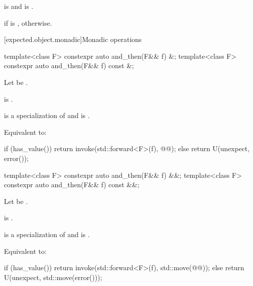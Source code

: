 \begin{itemdescr}
\pnum
\mandates
{} is  and
 is .

\pnum
\returns
{} if  is ,
 otherwise.
\end{itemdescr}

[expected.object.monadic]{Monadic operations}

%
\begin{itemdecl}
template<class F> constexpr auto and_then(F&& f) &;
template<class F> constexpr auto and_then(F&& f) const &;
\end{itemdecl}

\begin{itemdescr}
\pnum
Let  be .

\pnum
\constraints
{} is .

\pnum
\mandates
{} is a specialization of  and
 is .

\pnum
\effects
Equivalent to:
\begin{codeblock}
if (has_value())
  return invoke(std::forward<F>(f), @@);
else
  return U(unexpect, error());
\end{codeblock}
\end{itemdescr}

%
\begin{itemdecl}
template<class F> constexpr auto and_then(F&& f) &&;
template<class F> constexpr auto and_then(F&& f) const &&;
\end{itemdecl}

\begin{itemdescr}
\pnum
Let  be
.

\pnum
\constraints
{} is .

\pnum
\mandates
{} is a specialization of  and
 is .

\pnum
\effects
Equivalent to:
\begin{codeblock}
if (has_value())
  return invoke(std::forward<F>(f), std::move(@@));
else
  return U(unexpect, std::move(error()));
\end{codeblock}
\end{itemdescr}

